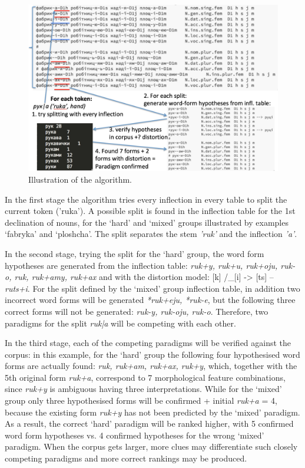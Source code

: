 \documentclass[11pt,a4paper]{article}
\begin{document}
\begin{figure}
	\includegraphics[width=\linewidth]{algorithm-illustration.jpg}
	\caption{Illustration of the algorithm.}
	\label{fig:alg_example}
\end{figure}

In the first stage the algorithm tries every inflection in every table to split the current token ('ruka'). A possible split is found in the inflection table for the 1st declination of nouns, for the `hard' and `mixed' groups illustrated by examples `fabryka' and `ploshcha'. The split separates the stem \emph{'ruk'} and the inflection \emph{'a'}.

In the second stage, trying the split for the `hard' group, the word form hypotheses are generated from the inflection table: \emph{ruk+y, ruk+u, ruk+oju, ruk-o, ruk, ruk+amy, ruk+ax} and with the distortion model: [k] /\_[i] -> [ts] -- \emph{ruts+i}. For the split defined by the `mixed' group inflection table, in addition two incorrect word forms will be generated \emph{*ruk+eju, *ruk-e}, but the following three correct forms will not be generated: \emph{ruk-y, ruk-oju, ruk-o}. Therefore, two paradigms for the split \emph{ruk|a} will be competing with each other.

In the third stage, each of the competing paradigms will be verified against the corpus: in this example, for the `hard' group the following four hypothesised word forms are actually found: \emph{ruk, ruk+am, ruk+ax, ruk+y}, which, together with the 5th original form \emph{ruk+a}, correspond to 7 morphological feature combinations, since \emph{ruk+y} is ambiguous having three interpretations. While for the `mixed' group only three hypothesised forms will be confirmed + initial \emph{ruk+a} = 4, because the existing form \emph{ruk+y} has not been predicted by the `mixed' paradigm. As a result, the correct `hard' paradigm will be ranked higher, with 5 confirmed word form hypotheses vs. 4 confirmed hypotheses for the wrong `mixed' paradigm. When the corpus gets larger, more clues may differentiate such closely competing paradigms and more correct rankings may be produced.
\end{document}
